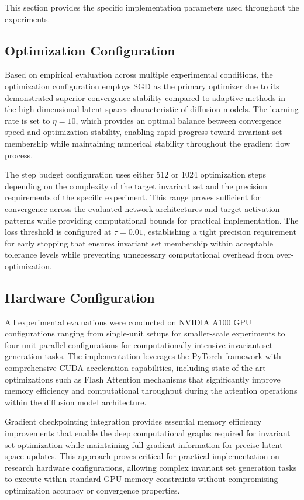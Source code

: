 This section provides the specific implementation parameters used throughout the experiments.

\subsection{Optimization Configuration}

Based on empirical evaluation across multiple experimental conditions, the optimization configuration employs SGD as the primary optimizer due to its demonstrated superior convergence stability compared to adaptive methods in the high-dimensional latent spaces characteristic of diffusion models. The learning rate is set to $\eta = 10$, which provides an optimal balance between convergence speed and optimization stability, enabling rapid progress toward invariant set membership while maintaining numerical stability throughout the gradient flow process.

The step budget configuration uses either 512 or 1024 optimization steps depending on the complexity of the target invariant set and the precision requirements of the specific experiment. This range proves sufficient for convergence across the evaluated network architectures and target activation patterns while providing computational bounds for practical implementation. The loss threshold is configured at $\tau = 0.01$, establishing a tight precision requirement for early stopping that ensures invariant set membership within acceptable tolerance levels while preventing unnecessary computational overhead from over-optimization.

\subsection{Hardware Configuration}

All experimental evaluations were conducted on NVIDIA A100 GPU configurations ranging from single-unit setups for smaller-scale experiments to four-unit parallel configurations for computationally intensive invariant set generation tasks. The implementation leverages the PyTorch framework with comprehensive CUDA acceleration capabilities, including state-of-the-art optimizations such as Flash Attention mechanisms that significantly improve memory efficiency and computational throughput during the attention operations within the diffusion model architecture.

Gradient checkpointing integration provides essential memory efficiency improvements that enable the deep computational graphs required for invariant set optimization while maintaining full gradient information for precise latent space updates. This approach proves critical for practical implementation on research hardware configurations, allowing complex invariant set generation tasks to execute within standard GPU memory constraints without compromising optimization accuracy or convergence properties.

